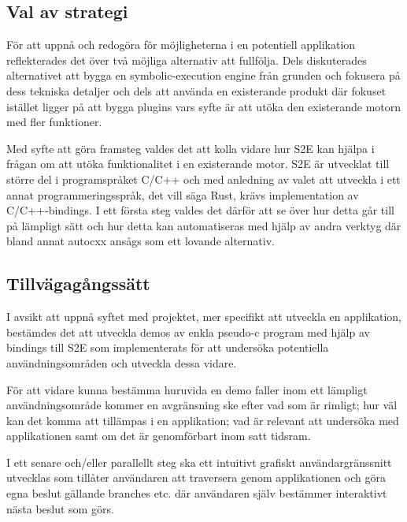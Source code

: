 \subsection{Val av strategi} 
För att uppnå och redogöra för möjligheterna i en
potentiell applikation reflekterades det över två möjliga alternativ att
fullfölja. Dels diskuterades alternativet att bygga en symbolic-execution engine
från grunden och fokusera på dess tekniska detaljer och dels att använda en
existerande produkt där fokuset istället ligger på att bygga plugins vars syfte
är att utöka den existerande motorn med fler funktioner. 

Med syfte att göra framsteg valdes det att kolla vidare hur S2E kan hjälpa i
frågan om att utöka funktionalitet i en existerande motor. S2E är utvecklat
till större del i programspråket C/C++ och med anledning av valet att utveckla i ett
annat programmeringsspråk, det vill säga Rust, krävs implementation av
C/C++-bindings. I ett första steg valdes det därför att se över hur detta går till
på lämpligt sätt och hur detta kan automatiseras med hjälp av andra verktyg
där bland annat autocxx ansågs som ett lovande alternativ. 

\subsection{Tillvägagångssätt} 
I avsikt att uppnå syftet med projektet, mer
specifikt att utveckla en applikation, bestämdes det att utveckla demos av enkla
pseudo-c program med hjälp av bindings till S2E som implementerats för att
undersöka potentiella användningsområden och utveckla dessa vidare. 

För att vidare kunna bestämma huruvida en demo faller inom ett lämpligt
användningsområde kommer en avgränsning ske efter vad som är rimligt; hur väl
kan det komma att tillämpas i en applikation; vad är relevant att undersöka med
applikationen samt om det är genomförbart inom satt tidsram. 

I ett senare och/eller parallellt steg ska ett intuitivt grafiskt användargränssnitt
utvecklas som tillåter användaren att traversera genom applikationen och göra
egna beslut gällande branches etc. där användaren själv bestämmer interaktivt
nästa beslut som görs. 




%  


